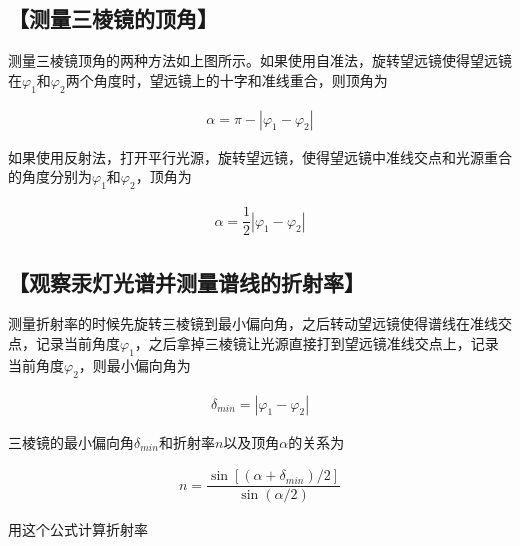 \documentclass{ctexart}
\let\oldsubsection\subsection
\renewcommand{\subsection}[1]{\oldsubsection{\!\!\!\!\!\!【#1】}}
\begin{document}
\subsection{测量三棱镜的顶角}

测量三棱镜顶角的两种方法如上图所示。如果使用自准法，旋转望远镜使得望远镜在$\varphi_1$和$\varphi_2$两个角度时，望远镜上的十字和准线重合，则顶角为

\begin{equation*}
  \begin{aligned}
    \alpha = \pi - \left| \varphi_1 - \varphi_2 \right|
  \end{aligned}
\end{equation*}

如果使用反射法，打开平行光源，旋转望远镜，使得望远镜中准线交点和光源重合的角度分别为$\varphi_1$和$\varphi_2$，顶角为

\begin{equation*}
  \begin{aligned}
    \alpha = \dfrac{1}{2}  \left| \varphi_1 - \varphi_2 \right|
  \end{aligned}
\end{equation*}

\subsection{观察汞灯光谱并测量谱线的折射率}

测量折射率的时候先旋转三棱镜到最小偏向角，之后转动望远镜使得谱线在准线交点，记录当前角度$\varphi_1$，之后拿掉三棱镜让光源直接打到望远镜准线交点上，记录当前角度$\varphi_2$，则最小偏向角为

\begin{equation*}
  \begin{aligned}
    \delta_{min} = \left| \varphi_1 - \varphi_2 \right|
  \end{aligned}
\end{equation*}

三棱镜的最小偏向角$\delta_{min}$和折射率$n$以及顶角$\alpha$的关系为

\begin{equation*}
  \begin{aligned}
    n = \dfrac{\sin \left[ \left( \alpha + \delta_{min} \right)/2 \right]}{\sin \left( \alpha /2 \right)} 
  \end{aligned}
\end{equation*}

用这个公式计算折射率
\end{document}
